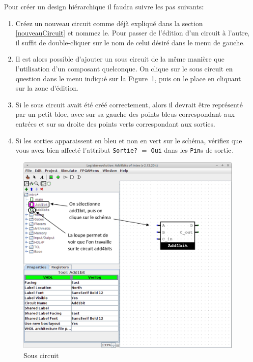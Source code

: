 \documentclass{article}
\begin{document}
    Pour créer un design hiérarchique il faudra suivre les pas
    suivants:
    \begin{enumerate}
        \item Créez un nouveau circuit comme déjà expliqué dans la section \ref{nouveauCircuit} et nommez le.
        Pour passer de l'édition d'un circuit à l'autre, il suffit de double-cliquer sur le nom de celui désiré dans le menu de
        gauche.
        \item Il est alors possible d'ajouter un sous circuit de la même manière que l'utilisation d'un
        composant quelconque.
        On clique sur le sous circuit en question dans le menu indiqué sur la Figure~\ref{fig_sousCircuit}, puis on le
        place en cliquant sur la zone d'édition.
        \item Si le sous circuit avait été créé correctement, alors il devrait être représenté par un petit bloc, avec
        sur sa gauche des points bleus correspondant aux entrées et sur sa droite des points verts correspondant aux sorties.
        \item Si les sorties apparaissent en bleu et non en vert sur le schéma, vérifiez que vous avez bien affecté l'attribut
        \texttt{Sortie?} $=$ \texttt{Oui} dans les \texttt{Pin}s de sortie.

    \end{enumerate}

    \begin{figure}[H]
        \begin{center}
            \includegraphics[width=450pt]{pictures/logisim_sousCircuit.png}
            \caption{\label{fig_sousCircuit}Sous circuit}
        \end{center}
    \end{figure}
\end{document}
